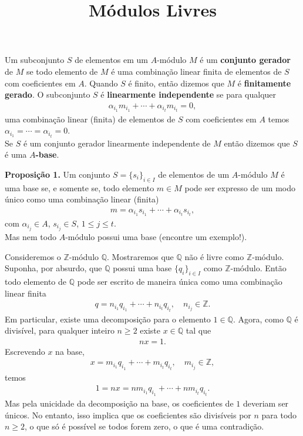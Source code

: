\documentclass{article}
\title{Módulos Livres}
\date{}
\begin{document}
\maketitle

Um subconjunto $S$ de elementos em um $A$-módulo $M$ é um \textbf{conjunto gerador} de $M$ se todo elemento de $M$ é uma combinação linear finita de elementos de $S$ com coeficientes em $A$. Quando $S$ é finito, então dizemos que $M$ é \textbf{{}finitamente gerado}. O subconjunto $S$  é \textbf{linearmente independente} se para qualquer
\begin{align*}
  \alpha_{i_1}m_{i_1} + \cdots + \alpha_{i_t}m_{i_t} = 0,
\end{align*}
uma combinação linear (finita) de elementos de $S$ com coeficientes em $A$ temos $\alpha_{i_1} = \cdots = \alpha_{i_t} = 0$.\\

Se $S$ é um conjunto gerador linearmente independente de $M$ então dizemos que $S$ é uma $A$\textbf{-base}.

\textbf{Proposição 1.} Um conjunto $S = \{s_i\}_{i \in I}$ de elementos de um $A$-módulo $M$ é uma base se, e somente se, todo elemento $m \in M$ pode ser expresso de um modo único como uma combinação linear (finita)
\begin{align*}
  m = \alpha_{i_1}s_{i_1} + \cdots + \alpha_{i_t}s_{i_t}, 
\end{align*}
com $\alpha_{i_j} \in A$, $s_{i_j} \in S$, $1 \leq j \leq t$.\\

Mas nem todo $A$-módulo possui uma base (encontre um exemplo!).

Consideremos o $\mathbb{Z}$-módulo $\mathbb{Q}$. Mostraremos que $\mathbb{Q}$ não é livre como $\mathbb{Z}$-módulo.\\

Suponha, por absurdo, que $\mathbb{Q}$ possui uma base $\{q_i\}_{i \in I}$ como $\mathbb{Z}$-módulo. Então todo elemento de $\mathbb{Q}$ pode ser escrito de maneira única como uma combinação linear finita
\begin{align*}
  q = n_{i_1} q_{i_1} + \cdots + n_{i_t} q_{i_t}, \quad n_{i_j} \in \mathbb{Z}.
\end{align*}
Em particular, existe uma decomposição para o elemento $1 \in \mathbb{Q}$. Agora, como $\mathbb{Q}$ é divisível, para qualquer inteiro $n \geq 2$ existe $x \in \mathbb{Q}$ tal que
\begin{align*}
  nx = 1.
\end{align*}
Escrevendo $x$ na base,
\begin{align*}
  x = m_{i_1} q_{i_1} + \cdots + m_{i_t} q_{i_t}, \quad m_{i_j} \in \mathbb{Z},
\end{align*}
temos
\begin{align*}
  1 = nx = n m_{i_1} q_{i_1} + \cdots + n m_{i_t} q_{i_t}.
\end{align*}
Mas pela unicidade da decomposição na base, os coeficientes de $1$ deveriam ser únicos. No entanto, isso implica que os coeficientes são divisíveis por $n$ para todo $n \geq 2$, o que só é possível se todos forem zero, o que é uma contradição.\\
\end{document}
